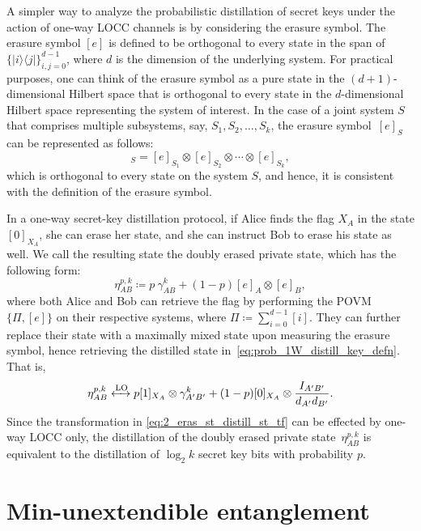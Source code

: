 \documentclass[twocolumn,letterpaper, dvipsnames,allowtoday, accepted = 2025-12-31]{quantumarticle}
\begin{document}
A simpler way to analyze the probabilistic distillation of secret keys under the action of one-way LOCC channels is by considering the erasure symbol. The erasure symbol $[e]$ is defined to be orthogonal to every state in the span of $\{|i\rangle\!\langle j|\}_{i,j=0}^{d-1}$, where $d$ is the dimension of the underlying system. For practical purposes, one can think of the erasure symbol as a pure state in the $(d+1)$-dimensional Hilbert space that is orthogonal to every state in the $d$-dimensional Hilbert space representing the system of interest. In the case of a joint system $S$ that comprises multiple subsystems, say, $S_1,S_2,\ldots,S_k$, the erasure symbol~$[e]_S$ can be represented as follows:
\begin{equation}
    [e]_S = [e]_{S_1}\otimes[e]_{S_2}\otimes\cdots\otimes[e]_{S_k},
\end{equation}
which is orthogonal to every state on the system $S$, and hence, it is consistent with the definition of the erasure symbol. 

In a one-way secret-key distillation protocol, if Alice finds the flag $X_A$ in the state $[0]_{X_A}$, she can erase her state, and she can instruct Bob to erase his state as well. We call the resulting state the doubly erased private state, which has the following form:  
\begin{equation}\label{eq:double_eras_priv_st}
    \eta^{p,k}_{AB} \coloneqq p~\gamma^k_{AB} + (1-p)[e]_A\otimes [e]_B,
\end{equation}
where both Alice and Bob can retrieve the flag by performing the POVM~$\{\Pi,[e]\}$ on their respective systems, where $\Pi \coloneqq \sum_{i=0}^{d-1} [i]$. They can further replace their state with a maximally mixed state upon measuring the erasure symbol, hence retrieving the distilled state in~\eqref{eq:prob_1W_distill_key_defn}. That is,
\begin{equation}\label{eq:2_eras_st_distill_st_tf}
    \eta^{p,k}_{AB} \xleftrightarrow[]{\operatorname{LO}} p[1]_{X_A}\otimes\gamma^k_{A'B'} + (1-p)[0]_{X_A}\otimes \frac{I_{A'B'}}{d_{A'}d_{B'}}.
\end{equation}
Since the transformation in \eqref{eq:2_eras_st_distill_st_tf} can be effected by one-way LOCC only, the distillation of the doubly erased private state~$\eta^{p,k}_{AB}$ is equivalent to the distillation of $\log_2 k$ secret key bits with probability $p$.

\section{Min-unextendible entanglement}
\end{document}
